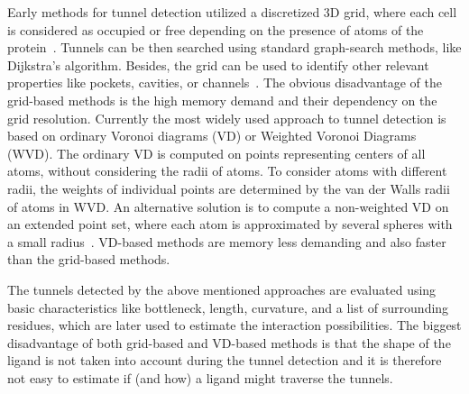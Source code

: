 \documentclass[letterpaper, 10 pt, conference]{ieeeconf} %
\begin{document}
Early methods for tunnel detection utilized a discretized 3D grid, where each cell is considered as occupied or free depending
on the presence of atoms of the protein~\cite{petrek2006caver,Petrek20071357}.
Tunnels can be then searched using standard graph-search methods, like Dijkstra's algorithm.
Besides, the grid can be used to identify other relevant properties like 
pockets, cavities, or channels~\cite{sehnal2013mole,petrek2006caver}.
The obvious disadvantage of the grid-based methods is the high memory demand and their dependency on the grid resolution.
Currently the most widely used approach to tunnel detection is based on ordinary Voronoi diagrams (VD) or Weighted Voronoi Diagrams (WVD). %
The ordinary VD is computed on points representing centers of all atoms, without considering the radii of atoms.
To consider atoms with different radii, the weights of individual points are determined by the van der Walls radii of atoms in WVD.
An alternative solution is to compute a non-weighted VD on an extended point set, where 
each atom is approximated by several spheres with a small radius~\cite{yaffe2008,caver3}.
VD-based methods are memory less demanding and also faster than the grid-based methods.

The tunnels detected by the above mentioned approaches are evaluated using basic characteristics like bottleneck, length, curvature, and a list of surrounding
residues, which are later used to estimate the interaction possibilities.
The biggest disadvantage of both grid-based and VD-based methods is that the shape of the ligand is not taken into account during the tunnel detection and it is therefore not easy to estimate if (and how) a ligand might traverse the tunnels.
\end{document}
